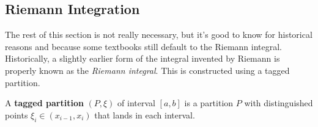 \subsection{Riemann Integration}

  The rest of this section is not really necessary, but it's good to know for historical reasons and because some textbooks still default to the Riemann integral. Historically, a slightly earlier form of the integral invented by Riemann is properly known as the \textit{Riemann integral}. This is constructed using a tagged partition. 

  \begin{definition}
    \label{def:tagged-partition}
    A \textbf{tagged partition} $(P, \xi)$ of interval $[a, b]$ is a partition $P$ with distinguished points $\xi_i \in (x_{i-1}, x_i)$ that lands in each interval. 
  \end{definition}

